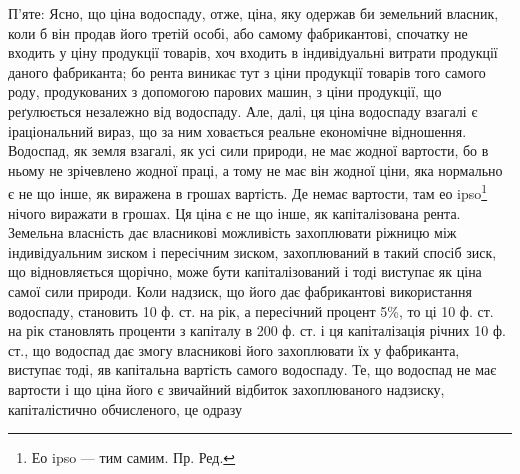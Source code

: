 П’яте: Ясно, що ціна водоспаду, отже, ціна, яку одержав би земельний
власник, коли б він продав його третій особі, або самому фабрикантові,
спочатку не входить у ціну продукції товарів, хоч входить в індивідуальні
витрати продукції даного фабриканта; бо рента виникає тут з ціни продукції
товарів того самого роду, продукованих з допомогою парових машин,
з ціни продукції, що реґулюється незалежно від водоспаду. Але, далі, ця ціна
водоспаду взагалі є іраціональний вираз, що за ним ховається реальне економічне
відношення. Водоспад, як земля взагалі, як усі сили природи, не має
жодної вартости, бо в ньому не зрічевлено жодної праці, а тому не має він
жодної ціни, яка нормально є не що інше, як виражена в грошах вартість.
Де немає вартости, там ео ipso\footnote*{
Ео ipso — тим самим. Пр. Ред.
} нічого виражати в грошах. Ця ціна є не
що інше, як капіталізована рента. Земельна власність дає власникові можливість
захоплювати ріжницю між індивідуальним зиском і пересічним зиском,
захоплюваний в такий спосіб зиск, що відновляється щорічно, може бути капіталізований
і тоді виступає як ціна самої сили природи. Коли надзиск, що
його дає фабрикантові використання водоспаду, становить 10 ф. ст. на рік, а
пересічний процент 5\%, то ці 10 ф. ст. на рік становлять проценти з капіталу в
200 ф. ст. і ця капіталізація річних 10 ф. ст., що водоспад дає змогу власникові
його захоплювати їх у фабриканта, виступає тоді, яв капітальна вартість самого
водоспаду. Те, що водоспад не має вартости і що ціна його є звичайний
відбиток захоплюваного надзиску, капіталістично обчисленого, це одразу
\parbreak{}  %
